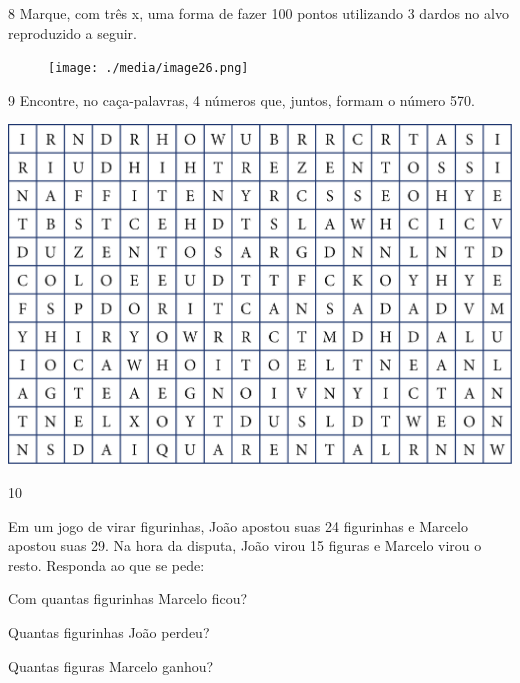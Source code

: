 \pagebreak

\num{8} Marque, com três x, uma forma de fazer 100 pontos utilizando 3 dardos no alvo reproduzido a seguir.

\begin{figure}[htpb!]
\centering
\texttt{[image: ./media/image26.png]}
\end{figure}


\num{9} Encontre, no caça-palavras, 4 números que, juntos, formam o número 570.

\begin{minipage}{.7\textwidth}
\includegraphics[width=\textwidth]{./media/image27.png}
\end{minipage}
\begin{minipage}{.3\textwidth}

\end{minipage}

\pagebreak
\num{10}

Em um jogo de virar figurinhas, João apostou suas 24 figurinhas e Marcelo apostou suas 29. Na hora da disputa, João virou 15 figuras e Marcelo virou o resto. Responda ao que se pede:

\begin{escolha}[itemsep=-5pt]
\item Com quantas figurinhas Marcelo ficou?

\item Quantas figurinhas João perdeu?

\item Quantas figuras Marcelo ganhou?
\end{escolha}

